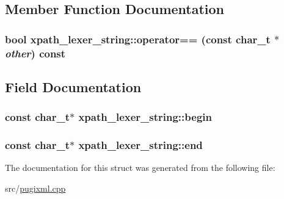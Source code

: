 \subsection{Member Function Documentation}
\hypertarget{structxpath__lexer__string_ac19adfd75832be8eff3f430aa3cb3c14}{
\subsubsection[{operator==}]{\setlength{\rightskip}{0pt plus 5cm}bool xpath\_\-lexer\_\-string::operator== (const char\_\-t $\ast$ {\em other}) const}}
\label{structxpath__lexer__string_ac19adfd75832be8eff3f430aa3cb3c14}


\subsection{Field Documentation}
\hypertarget{structxpath__lexer__string_a0b985863d7363a75d4fdd0a7ece1fca0}{
\subsubsection[{begin}]{\setlength{\rightskip}{0pt plus 5cm}const char\_\-t$\ast$ {\bf xpath\_\-lexer\_\-string::begin}}}
\label{structxpath__lexer__string_a0b985863d7363a75d4fdd0a7ece1fca0}
\hypertarget{structxpath__lexer__string_a13bbedeca2f8c2fb1e294325eea66878}{
\subsubsection[{end}]{\setlength{\rightskip}{0pt plus 5cm}const char\_\-t$\ast$ {\bf xpath\_\-lexer\_\-string::end}}}
\label{structxpath__lexer__string_a13bbedeca2f8c2fb1e294325eea66878}


The documentation for this struct was generated from the following file:\begin{DoxyCompactItemize}
\item 
src/\hyperlink{pugixml_8cpp}{pugixml.cpp}\end{DoxyCompactItemize}
